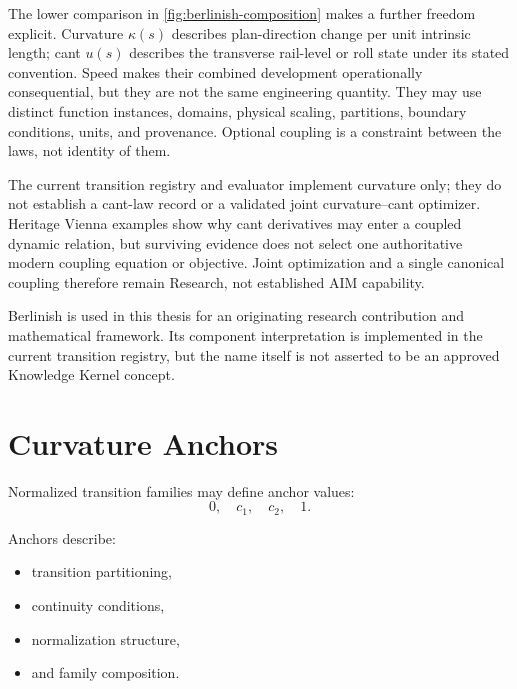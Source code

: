 The lower comparison in \cref{fig:berlinish-composition} makes a further
freedom explicit. Curvature \(\kappa(s)\) describes plan-direction change per
unit intrinsic length; cant \(u(s)\) describes the transverse rail-level or
roll state under its stated convention. Speed makes their combined development
operationally consequential, but they are not the same engineering quantity.
They may use distinct function instances, domains, physical scaling,
partitions, boundary conditions, units, and provenance. Optional coupling is a
constraint between the laws, not identity of them.

The current transition registry and evaluator implement curvature only; they
do not establish a cant-law record or a validated joint curvature--cant
optimizer. Heritage Vienna examples show why cant derivatives may enter a
coupled dynamic relation, but surviving evidence does not select one
authoritative modern coupling equation or objective. Joint optimization and a
single canonical coupling therefore remain Research, not established AIM
capability.

\begin{remark}
Berlinish is used in this thesis for an originating research contribution and
mathematical framework. Its component interpretation is implemented in the
current transition registry, but the name itself is not asserted to be an
approved Knowledge Kernel concept.
\end{remark}

\section{Curvature Anchors}

\begin{definition}
\label{def:curvature-anchors}
Normalized transition families may define anchor values:
\[
0,
\quad
c_1,
\quad
c_2,
\quad
1.
\]
\end{definition}

Anchors describe:
\begin{itemize}
\item transition partitioning,
\item continuity conditions,
\item normalization structure,
\item and family composition.
\end{itemize}

